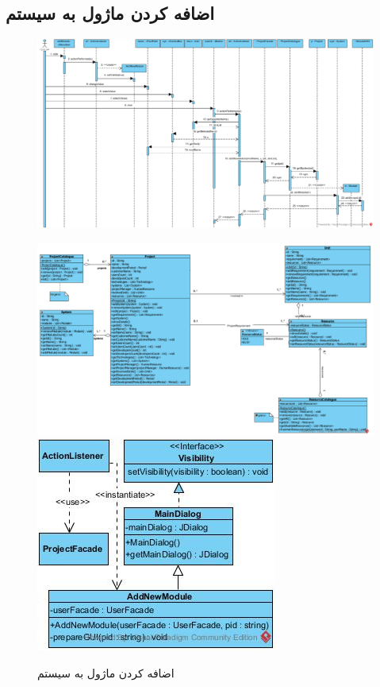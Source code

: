 \begin{landscape}
\section{اضافه کردن ماژول به سیستم}
\begin{figure}[H]
	\centering
	\includegraphics[scale=0.55]{img/sequence-design/AddModuleToSystem}
\end{figure}
\begin{figure}[H]
	\centering
	\includegraphics[scale=0.4]{img/sequence-design/AddModuleToSystemC}
	\includegraphics[scale=0.65]{img/sequence-design/AddModuleToSystemUI}
	\caption{اضافه کردن ماژول به سیستم}
\end{figure}


\end{landscape}

